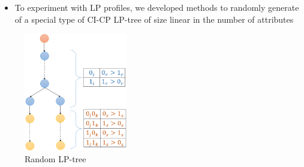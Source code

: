 {
	\begin{itemize}
		\item To experiment with LP profiles, we developed methods to randomly generate
					 of
          a special type of CI-CP LP-tree of size linear in the number of
          attributes
	\end{itemize}

	\begin{figure}
		\vspace{-0.2cm}
		\centering
		\includegraphics[width=0.4\textwidth]{figs/LPTrees/simple_LP_tree.png}
		\vspace{-0.3cm}
		\caption{Random LP-tree}
	\end{figure}
}

